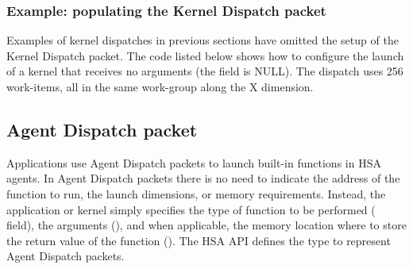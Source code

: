 \documentclass[final,oneside]{book}
\begin{document}
\subsubsection{Example: populating the Kernel Dispatch packet}
Examples of kernel dispatches in previous sections have omitted the setup of the
Kernel Dispatch packet. The code listed below shows how to configure the launch
of a kernel that receives no arguments (the
 field is NULL). The
dispatch uses 256 work-items, all in the same work-group along the X dimension.



\subsection{Agent Dispatch packet}\label{agent-packet}

Applications use Agent Dispatch packets to launch built-in functions in HSA agents. In
Agent Dispatch packets there is no need to indicate the address of the function
to run, the launch dimensions, or memory requirements. Instead, the application
or kernel simply specifies the type of function to be performed
( field), the arguments
(), and when applicable, the memory
location where to store the return value of the function
(). The HSA API defines the
type  to represent Agent Dispatch packets.
\end{document}
